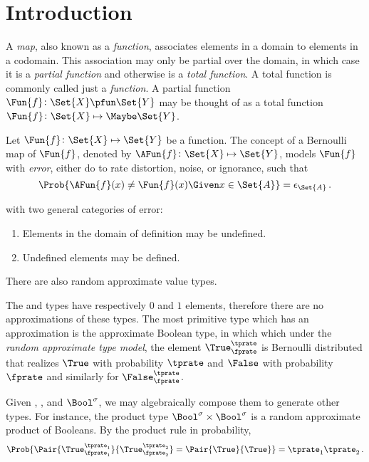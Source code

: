 \documentclass[ ../main.tex]{subfiles}
\begin{document}
\section{Introduction}
A \emph{map}, also known as a \emph{function}, associates elements in a domain to elements in a codomain.
This association may only be partial over the domain, in which case it is a \emph{partial function} and otherwise is a \emph{total function}.
A total function is commonly called just a \emph{function}.
A partial function $\Fun{f} \colon \Set{X} \pfun \Set{Y}$ may be thought of as a total function $\Fun{f} \colon \Set{X} \mapsto \Maybe \Set{Y}$.

Let $\Fun{f} \colon \Set{X} \mapsto \Set{Y}$ be a function.
The concept of a Bernoulli map of $\Fun{f}$, denoted by $\AFun{f} \colon \Set{X} \mapsto \Set{Y}$, models $\Fun{f}$ with \emph{error}, either do to rate distortion, noise, or ignorance, such that
\begin{equation}
    \Prob{\AFun{f}(x) \neq \Fun{f}(x) \Given x \in \Set{A}} = \epsilon_{\Set{A}}\,.
\end{equation}




with two general categories of error:
\begin{enumerate}
	\item Elements in the domain of definition may be undefined.
	\item Undefined elements may be defined.
\end{enumerate}

There are also random approximate value types.

The \Void and \Unit types have respectively $0$ and $1$ elements, therefore there are no approximations of these types.
The most primitive type which has an approximation is the approximate Boolean type, in which which under the \emph{random approximate type model}, the element $\True_\fprate^\tprate$ is Bernoulli distributed that realizes $\True$ with probability $\tprate$ and $\False$ with probability $\fprate$ and similarly for $\False_\fprate^\tprate$.

Given \Void, \Unit, and $\Bool^{\sigma}$, we may algebraically compose them to generate other types.
For instance, the product type $\Bool^{\sigma} \times \Bool^{\sigma}$ is a random approximate product of Booleans.
By the product rule in probability,
\begin{equation}
	\Prob{\Pair{\True_{\fprate_1}^{\tprate_1}}{\True_{\fprate_2}^{\tprate_2}} = \Pair{\True}{\True}} = \tprate_1 \tprate_2\,.
\end{equation}
\end{document}
